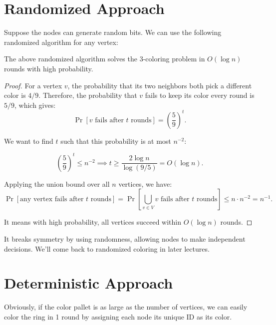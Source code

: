 \section{Randomized Approach}

Suppose the nodes can generate random bits. We can use the following randomized algorithm for any vertex:

\begin{algorithm}[H]
	\caption{Randomized 3-coloring Algorithm}
\end{algorithm}

\begin{theorem}
	The above randomized algorithm solves the 3-coloring problem in $O(\log n)$ rounds with high probability.
\end{theorem}

\begin{proof}
	For a vertex $v$, the probability that its two neighbors both pick a different color is $4/9$. Therefore, the probability that $v$ fails to keep its color every round is $5/9$, which gives:
	\[
		\Pr[\text{$v$ fails after $t$ rounds}] = \left(\frac{5}{9}\right)^t.
	\]

	We want to find $t$ such that this probability is at most $n^{-2}$:

	\[
		\left(\frac{5}{9}\right)^t \leq n^{-2} \implies t \geq \frac{2 \log n}{\log(9/5)} = O(\log n).
	\]

	Applying the union bound over all $n$ vertices, we have:
	\[
		\Pr[\text{any vertex fails after $t$ rounds}] = \Pr\left[\bigcup_{v \in V} \text{$v$ fails after $t$ rounds}\right] \leq n \cdot n^{-2} = n^{-1}.
	\]

	It means with high probability, all vertices succeed within $O(\log n)$ rounds.
\end{proof}

It breaks symmetry by using randomness, allowing nodes to make independent decisions. We'll come back to randomized coloring in later lectures.

\section{Deterministic Approach}

Obviously, if the color pallet is as large as the number of vertices, we can easily color the ring in 1 round by assigning each node its unique ID as its color.

